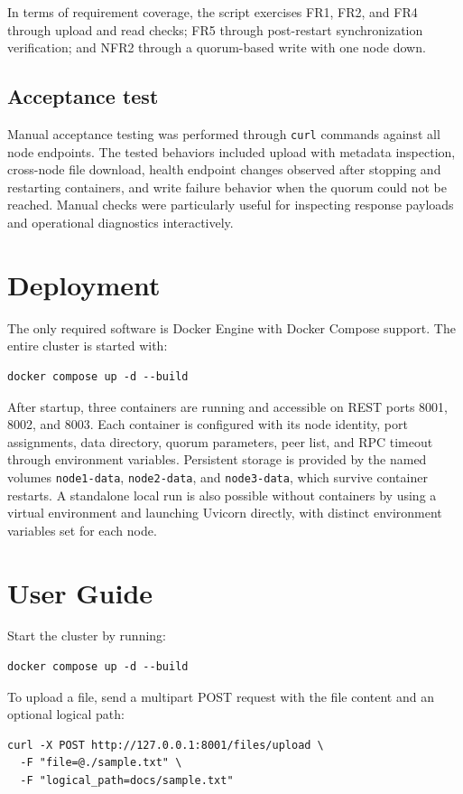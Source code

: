 \documentclass{scrartcl}
\begin{document}
In terms of requirement coverage, the script exercises FR1, FR2, and FR4 through upload and read checks; FR5 through post-restart synchronization verification; and NFR2 through a quorum-based write with one node down.

\subsection{Acceptance test}\label{acceptance-test}

Manual acceptance testing was performed through \texttt{curl} commands against all node endpoints. The tested behaviors included upload with metadata inspection, cross-node file download, health endpoint changes observed after stopping and restarting containers, and write failure behavior when the quorum could not be reached. Manual checks were particularly useful for inspecting response payloads and operational diagnostics interactively.

\section{Deployment}\label{deployment}

The only required software is Docker Engine with Docker Compose support. The entire cluster is started with:
\begin{verbatim}
docker compose up -d --build
\end{verbatim}
After startup, three containers are running and accessible on REST ports 8001, 8002, and 8003. Each container is configured with its node identity, port assignments, data directory, quorum parameters, peer list, and RPC timeout through environment variables. Persistent storage is provided by the named volumes \texttt{node1-data}, \texttt{node2-data}, and \texttt{node3-data}, which survive container restarts. A standalone local run is also possible without containers by using a virtual environment and launching Uvicorn directly, with distinct environment variables set for each node.

\section{User Guide}\label{user-guide}

Start the cluster by running:
\begin{verbatim}
docker compose up -d --build
\end{verbatim}

To upload a file, send a multipart POST request with the file content and an optional logical path:
\begin{verbatim}
curl -X POST http://127.0.0.1:8001/files/upload \
  -F "file=@./sample.txt" \
  -F "logical_path=docs/sample.txt"
\end{verbatim}
\end{document}
